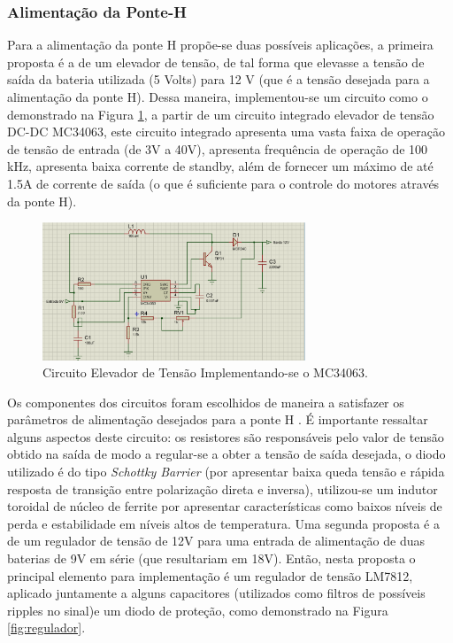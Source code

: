 \subsubsection{Alimentação da Ponte-H}

Para a alimentação da ponte H propõe-se duas possíveis aplicações, a primeira proposta é a de um elevador de tensão, de tal forma que
elevasse a tensão de saída da bateria utilizada (5 Volts) para 12 V (que é a tensão desejada para a alimentação da ponte H). Dessa maneira,
implementou-se um circuito como o demonstrado na Figura \ref{fig:elevador}, a partir de um circuito integrado elevador de tensão DC-DC MC34063, este
circuito integrado apresenta uma vasta faixa de operação de tensão de entrada (de 3V a 40V), apresenta frequência de operação de 100 kHz,
apresenta baixa corrente de standby, além de fornecer um máximo de até 1.5A de corrente de saída (o que é suficiente para o controle
do motores através da ponte H)\cite{kuhl:2013}.

\begin{figure}[H]
    \centering
    \includegraphics[width=0.7\textwidth]{figuras/elevador.eps}
    \caption{Circuito Elevador de Tensão Implementando-se o MC34063.}
    \label{fig:elevador}
\end{figure}

Os componentes dos circuitos foram escolhidos de maneira a satisfazer os parâmetros de alimentação desejados para a ponte H
 \cite{kuhl:2013}. É importante ressaltar alguns aspectos deste circuito: os resistores são responsáveis pelo valor
de tensão obtido na saída de modo a regular-se  a obter a tensão de saída desejada, o diodo utilizado é do tipo \textit{Schottky Barrier} (por
apresentar baixa queda tensão e rápida resposta de transição entre polarização direta e inversa), utilizou-se um indutor toroidal de
núcleo de ferrite por apresentar características como baixos níveis de perda e estabilidade em níveis altos de temperatura.
Uma segunda proposta é a de um regulador de tensão de 12V para uma entrada de alimentação de duas baterias de 9V em série (que resultariam
em 18V). Então, nesta proposta o principal elemento para implementação é um regulador de tensão LM7812, aplicado juntamente a alguns
capacitores (utilizados como filtros de possíveis ripples no sinal)e um diodo de proteção, como demonstrado na Figura \ref{fig:regulador}.

